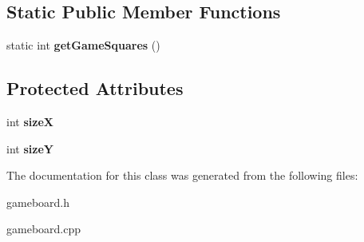 \subsection*{Static Public Member Functions}
\begin{DoxyCompactItemize}
\item 
\hypertarget{class_gameboard_aa10ed162ff321f4fe480e531ef352bd8}{}static int {\bfseries get\+Game\+Squares} ()\label{class_gameboard_aa10ed162ff321f4fe480e531ef352bd8}

\end{DoxyCompactItemize}
\subsection*{Protected Attributes}
\begin{DoxyCompactItemize}
\item 
\hypertarget{class_gameboard_a50499cde2f942a0d18d261a7103e1e2a}{}int {\bfseries size\+X}\label{class_gameboard_a50499cde2f942a0d18d261a7103e1e2a}

\item 
\hypertarget{class_gameboard_a1a60c1746c1bfa669b3bf7b3dfc6534d}{}int {\bfseries size\+Y}\label{class_gameboard_a1a60c1746c1bfa669b3bf7b3dfc6534d}

\end{DoxyCompactItemize}


The documentation for this class was generated from the following files\+:\begin{DoxyCompactItemize}
\item 
gameboard.\+h\item 
gameboard.\+cpp\end{DoxyCompactItemize}
